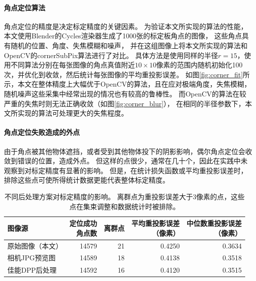 \paragraph{角点定位算法}
角点定位的精度是决定标定精度的关键因素。
为验证本文所实现的算法的性能，本文使用Blender的Cycles渲染器生成了1000张的标定板角点的图像，
这些角点具有随机的位置、角度、失焦模糊和噪声，
并在这组图像上将本文所实现的算法和OpenCV的cornerSubPix算法进行了对比。
具体方法是使用同样的半径$r=15$，使用不同算法分别在每张图像的角点真值附近$10\times 10$像素的范围内随机初始化100次，并优化到收敛，然后统计每张图像的平均重投影误差。
如图\ref{fig:corner_fit}所示，本文在整体精度上大幅优于OpenCV的算法，且在应对极端角度，失焦模糊，随机噪声这些采集中经常出现的情况也有较高的鲁棒性。
而OpenCV的算法在较严重的失焦时则无法正确收敛（如图\ref{fig:corner_blur}），
在相同的半径参数下，本文所实现的算法可处理更大的失焦程度。

\paragraph{角点定位失败造成的外点}
由于角点被其他物体遮挡，或者受到其他物体投下的阴影影响，偶尔角点定位会收敛到错误的位置，造成外点。
但这样的点很少，通常在几十个，因此在实践中未观察到对标定精度有显著的影响。
但是，在统计损失函数或平均重投影误差时，排除这些点可使所得统计数据更能代表整体标定精度。

\begin{table}
    \centering
    \caption[不同后处理方案对标定精度的影响]{
        不同后处理方案对标定精度的影响。
        离群点为重投影误差大于3像素的点，这些点在集束调整和数据统计时被排除。
    }
    \begin{tabular}{l|rrrr}
        \toprule
        图像源 & \shortstack{定位成功\\角点数} & 离群点 & \shortstack{平均重投影误差\\（像素）}& \shortstack{中位数重投影误差\\（像素）} \\
        \midrule
        原始图像（本文） & 14579 & 21 & 0.4250 & 0.3634 \\
        相机JPG预览图   & 14589 & 18 & 0.4138 & 0.3518 \\
        佳能DPP后处理   & 14592 & 16 & 0.4120 & 0.3515 \\
        \bottomrule
    \end{tabular}
    \label{tab:camera_postprocess}
\end{table}


